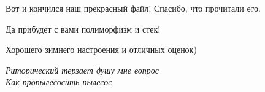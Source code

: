 \vspace*{250pt}
\noindent\makebox[\linewidth]{\rule{\paperwidth}{0.4pt}}
\vspace*{20pt}
{\begin{myquote2}
\begin{center}
    \bf \begin{small}{
    Вот и кончился наш прекрасный файл! Спасибо, что прочитали его.

    Да прибудет с вами полиморфизм и стек!

    Хорошего зимнего настроения и отличных оценок)

}\end{small}\end{center}
\begin{flushright}
    \textit{Риторический терзает душу мне вопрос\\
    Как пропылесосить пылесос}
    \end{flushright}
\end{myquote2}}

\vspace*{20pt}
\noindent\makebox[\linewidth]{\rule{\paperwidth}{0.4pt}}
\vspace*{20pt}
\newpage
\let\clearpage\relax





